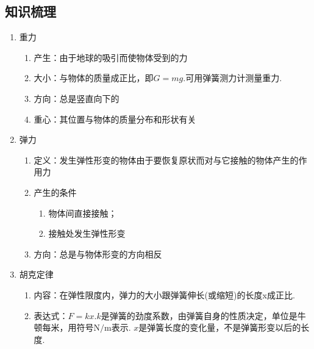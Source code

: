 \documentclass[cn,11pt]{elegantbook}
\begin{document}
      \subsection{知识梳理}
      \begin{enumerate}
         \item 重力
         \begin{enumerate}
            \item 产生：由于地球的吸引而使物体受到的力
            \item 大小：与物体的质量成正比，即$G=m g$.可用弹簧测力计测量重力.
            \item 方向：总是竖直向下的
            \item 重心：其位置与物体的质量分布和形状有关
            
         \end{enumerate}
         \item 弹力
         \begin{enumerate}
            \item 定义：发生弹性形变的物体由于要恢复原状而对与它接触的物体产生的作用力
            \item 产生的条件
            \begin{enumerate}
               \item 物体间直接接触；
               \item 接触处发生弹性形变
               
            \end{enumerate}
            \item 方向：总是与物体形变的方向相反
            
         \end{enumerate}
         \item 胡克定律
         \begin{enumerate}
            \item 内容：在弹性限度内，弹力的大小跟弹簧伸长(或缩短)的长度x成正比.
            \item 表达式：$F=k x$.$k$是弹簧的劲度系数，由弹簧自身的性质决定，单位是牛顿每米，用符号$\mathrm{N} / \mathrm{m}$表示. $x$是弹簧长度的变化量，不是弹簧形变以后的长度.
            

\end{enumerate}
\end{enumerate}
\end{document}
